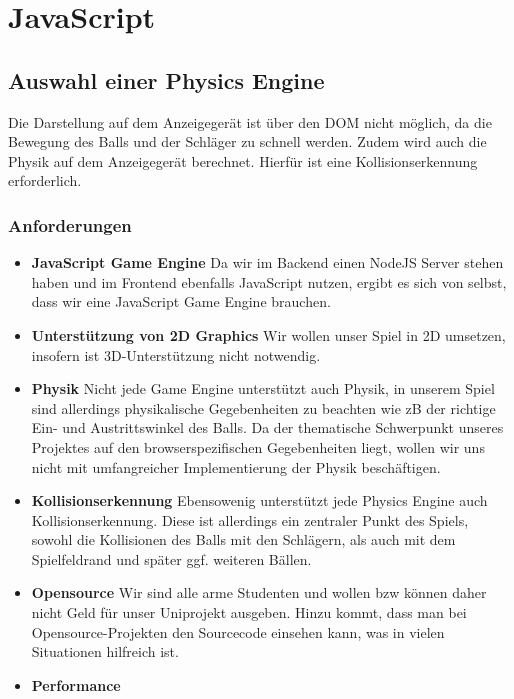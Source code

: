 \chapter{JavaScript}
\section{Auswahl einer Physics Engine}
Die Darstellung auf dem Anzeigegerät ist über den DOM nicht möglich, da die Bewegung des Balls und der Schläger zu schnell werden. Zudem wird auch die Physik auf dem Anzeigegerät berechnet. Hierfür ist eine Kollisionserkennung erforderlich.

\subsection{Anforderungen}
\begin{itemize}
\item \textbf{JavaScript Game Engine} \newline
Da wir im Backend einen NodeJS Server stehen haben und im Frontend ebenfalls JavaScript nutzen, ergibt es sich von selbst, dass wir eine JavaScript Game Engine brauchen.
\item \textbf{Unterstützung von 2D Graphics} \newline
Wir wollen unser Spiel in 2D umsetzen, insofern ist 3D-Unterstützung nicht notwendig.
\item \textbf{Physik} \newline
Nicht jede Game Engine unterstützt auch Physik, in unserem Spiel sind allerdings physikalische Gegebenheiten zu beachten wie zB der richtige Ein- und Austrittswinkel des Balls. Da der thematische Schwerpunkt unseres Projektes auf den browserspezifischen Gegebenheiten liegt, wollen wir uns nicht mit umfangreicher Implementierung der Physik beschäftigen.
\item \textbf{Kollisionserkennung} \newline
Ebensowenig unterstützt jede Physics Engine auch Kollisionserkennung. Diese ist allerdings ein zentraler Punkt des Spiels, sowohl die Kollisionen des Balls mit den Schlägern, als auch mit dem Spielfeldrand und später ggf. weiteren Bällen.
\item \textbf{Opensource} \newline
Wir sind alle arme Studenten und wollen bzw können daher nicht Geld für unser Uniprojekt ausgeben. Hinzu kommt, dass man bei Opensource-Projekten den Sourcecode einsehen kann, was in vielen Situationen hilfreich ist.
\item \textbf{Performance} \newline

\end{itemize}
